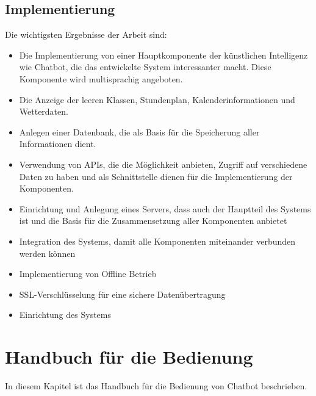 \subsection{Implementierung}
Die wichtigsten Ergebnisse der Arbeit sind: 
\begin{itemize}
	\item Die Implementierung von einer Hauptkomponente der künstlichen Intelligenz wie Chatbot, die das entwickelte System interessanter macht. Diese Komponente wird multisprachig angeboten.
\end{itemize}
\begin{itemize}
	\item Die Anzeige der leeren Klassen, Stundenplan, Kalenderinformationen und Wetterdaten.
\end{itemize}
\begin{itemize}
	\item Anlegen einer Datenbank, die als Basis für die Speicherung aller Informationen dient.
\end{itemize}
\begin{itemize}
	\item Verwendung von APIs, die die Möglichkeit anbieten, Zugriff auf verschiedene Daten zu haben und als Schnittstelle dienen für die Implementierung der Komponenten.
\end{itemize}
\begin{itemize}
	\item 
	Einrichtung und Anlegung eines Servers, dass auch der Hauptteil des Systems ist und die Basis für die Zusammensetzung aller Komponenten anbietet
\end{itemize}
\begin{itemize}
	\item 
	Integration des Systems, damit alle Komponenten miteinander verbunden werden können
\end{itemize}
\begin{itemize}
	\item 
	Implementierung von Offline Betrieb
\end{itemize}
\begin{itemize}
	\item 
	SSL-Verschl\"usselung f\"ur eine sichere Daten\"ubertragung
\end{itemize}
\begin{itemize}
	\item 
	Einrichtung des Systems
\end{itemize}
\section{Handbuch für die Bedienung}
In diesem Kapitel ist das Handbuch für die Bedienung von Chatbot beschrieben.
